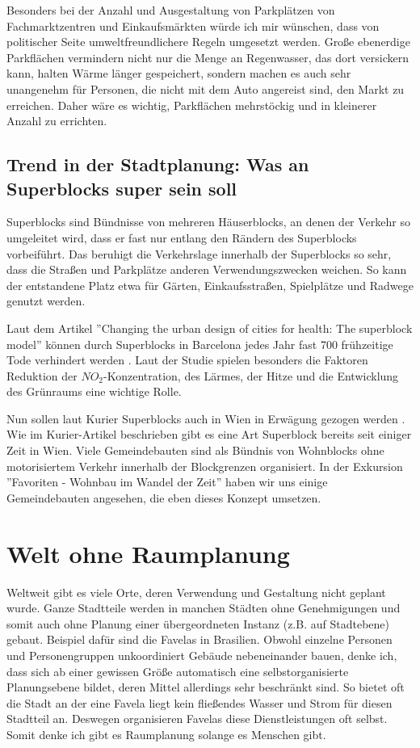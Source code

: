 \documentclass[]{article}
\begin{document}
Besonders bei der Anzahl und Ausgestaltung von Parkplätzen von Fachmarktzentren und Einkaufsmärkten würde ich mir wünschen, dass von politischer Seite umweltfreundlichere Regeln umgesetzt werden. Große ebenerdige Parkflächen vermindern nicht nur die Menge an Regenwasser, das dort versickern kann, halten Wärme länger gespeichert, sondern machen es auch sehr unangenehm für Personen, die nicht mit dem Auto angereist sind, den Markt zu erreichen. Daher wäre es wichtig, Parkflächen mehrstöckig und in kleinerer Anzahl zu errichten.

\subsection{Trend in der Stadtplanung: Was an Superblocks super sein soll}
Superblocks sind Bündnisse von mehreren Häuserblocks, an denen der Verkehr so umgeleitet wird, dass er fast nur entlang den Rändern des Superblocks vorbeiführt. Das beruhigt die Verkehrslage innerhalb der Superblocks so sehr, dass die Straßen und Parkplätze anderen Verwendungszwecken weichen. So kann der entstandene Platz etwa für Gärten, Einkaufsstraßen, Spielplätze und Radwege genutzt werden.

Laut dem Artikel ''Changing the urban design of cities for health: The superblock model'' können durch Superblocks in Barcelona jedes Jahr fast 700 frühzeitige Tode verhindert werden \cite{superblock_barcelona}. Laut der Studie spielen besonders die Faktoren Reduktion der $NO_2$-Konzentration, des Lärmes, der Hitze und die Entwicklung des Grünraums eine wichtige Rolle.

Nun sollen laut Kurier Superblocks auch in Wien in Erwägung gezogen werden \cite{superblocks_wien}. Wie im Kurier-Artikel beschrieben gibt es eine Art Superblock bereits seit einiger Zeit in Wien. Viele Gemeindebauten sind als Bündnis von Wohnblocks ohne motorisiertem Verkehr innerhalb der Blockgrenzen organisiert. In der Exkursion ''Favoriten - Wohnbau im Wandel der Zeit'' haben wir uns einige Gemeindebauten angesehen, die eben dieses Konzept umsetzen.

\section{Welt ohne Raumplanung}
Weltweit gibt es viele Orte, deren Verwendung und Gestaltung nicht geplant wurde. Ganze Stadtteile werden in manchen Städten ohne Genehmigungen und somit auch ohne Planung einer übergeordneten Instanz (z.B. auf Stadtebene) gebaut. Beispiel dafür sind die Favelas in Brasilien. Obwohl einzelne Personen und Personengruppen unkoordiniert Gebäude nebeneinander bauen, denke ich, dass sich ab einer gewissen Größe automatisch eine selbstorganisierte Planungsebene bildet, deren Mittel allerdings sehr beschränkt sind. So bietet oft die Stadt an der eine Favela liegt kein fließendes Wasser und Strom für diesen Stadtteil an. Deswegen organisieren Favelas diese Dienstleistungen oft selbst. Somit denke ich gibt es Raumplanung solange es Menschen gibt.
\end{document}
